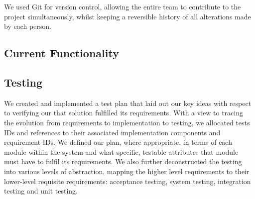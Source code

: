 We used Git for version control, allowing the entire team to contribute to the project simultaneously, whilst keeping a reversible history of all alterations made by each person.

\subsection{Current Functionality}
\label{sec:prototype-functionality}

\subsection{Testing} 
\label{sec:prototype-testing}

We created and implemented a test plan that laid out our key ideas with respect to verifying our that solution fulfilled its requirements. With a view to tracing the evolution from requirements to implementation to testing, we allocated tests IDs and references to their associated implementation components and requirement IDs. We defined our plan, where appropriate, in terms of each module within the system and what specific, testable attributes that module must have to fulfil its requirements. We also further deconstructed the testing into various levels of abstraction, mapping the higher level requirements to their lower-level requisite requirements: acceptance testing, system testing, integration testing and unit testing. %


